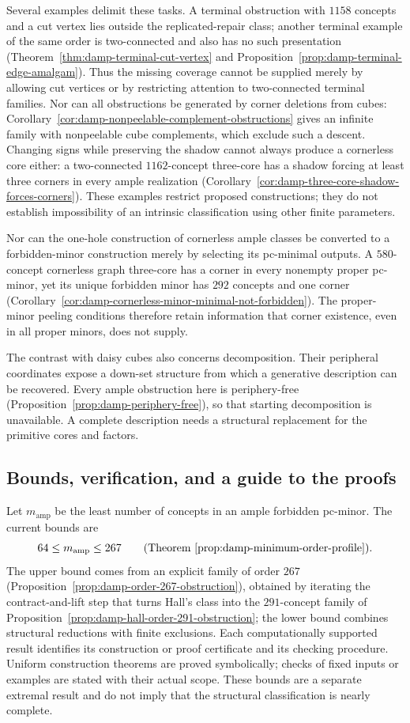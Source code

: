 \documentclass[11pt]{article}
\numberwithin{equation}{section}
\theoremstyle{definition}
\theoremstyle{remark}
\begin{document}
Several examples delimit these tasks.  A terminal obstruction with
\(1158\) concepts and a cut vertex lies outside the replicated-repair
class; another terminal example of the same order is two-connected
and also has no such presentation
(Theorem~\ref{thm:damp-terminal-cut-vertex} and
Proposition~\ref{prop:damp-terminal-edge-amalgam}).  Thus the missing
coverage cannot be supplied merely by allowing cut vertices or by
restricting attention to two-connected terminal families.  Nor can all
obstructions be generated by corner deletions from cubes:
Corollary~\ref{cor:damp-nonpeelable-complement-obstructions} gives
an infinite family with nonpeelable cube complements, which exclude
such a descent.  Changing signs while preserving the shadow cannot always produce a
cornerless core either: a two-connected \(1162\)-concept three-core
has a shadow forcing at least three corners in every ample realization
(Corollary~\ref{cor:damp-three-core-shadow-forces-corners}).
These examples restrict proposed constructions; they do not establish
impossibility of an intrinsic classification using other finite parameters.

Nor can the one-hole construction of cornerless ample classes be
converted to a forbidden-minor construction merely by selecting its
pc-minimal outputs.  A \(580\)-concept cornerless graph three-core has
a corner in every nonempty proper pc-minor, yet its unique forbidden
minor has \(292\) concepts and one corner
(Corollary~\ref{cor:damp-cornerless-minor-minimal-not-forbidden}).
The proper-minor peeling conditions therefore retain information that
corner existence, even in all proper minors, does not supply.

The contrast with daisy cubes also concerns decomposition.  Their
peripheral coordinates expose a down-set structure from which a
generative description can be recovered.  Every ample obstruction
here is periphery-free
(Proposition~\ref{prop:damp-periphery-free}), so that starting
decomposition is unavailable.  A complete description needs a
structural replacement for the primitive cores and factors.

\subsection{Bounds, verification, and a guide to the proofs}

Let \(m_{\mathrm{amp}}\) be the least number of concepts in an ample
forbidden pc-minor.  The current bounds are
\[
 64\le m_{\mathrm{amp}}\le267
 \qquad\text{(Theorem~\ref{prop:damp-minimum-order-profile}).}
\]
The upper bound comes from an explicit family of order \(267\)
(Proposition~\ref{prop:damp-order-267-obstruction}), obtained by iterating
the contract-and-lift step that turns Hall's class into the
\(291\)-concept family of
Proposition~\ref{prop:damp-hall-order-291-obstruction}; the lower
bound combines structural reductions with finite exclusions.  Each
computationally supported result identifies its construction or proof
certificate and its checking procedure.  Uniform construction theorems
are proved symbolically; checks of fixed inputs or examples are stated
with their actual scope.  These bounds are a separate extremal result
and do not imply that the structural classification is nearly complete.
\end{document}
